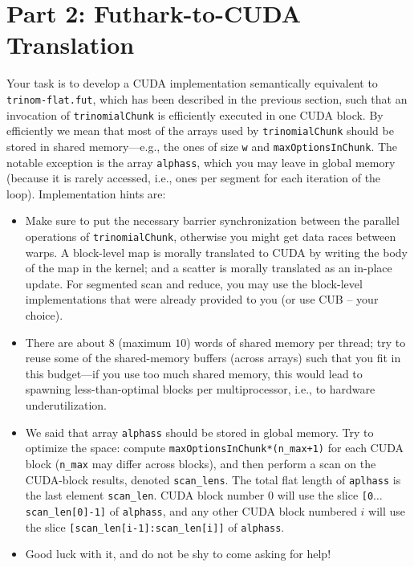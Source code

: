 \documentclass[a4paper,11pt]{article}
\begin{document}
\section{Part 2: Futhark-to-CUDA Translation}

Your task is to develop a CUDA implementation semantically equivalent to 
{\tt trinom-flat.fut}, which has been described in the previous
section, such that an invocation  of {\tt trinomialChunk} is efficiently 
executed in one CUDA block. By efficiently we mean that most of the arrays 
used by {\tt trinomialChunk} should be stored in shared memory---e.g.,
the ones of size {\tt w} and {\tt maxOptionsInChunk}. The notable exception
is the array {\tt alphass}, which you may leave in global memory (because
it is rarely accessed, i.e., ones per segment for each iteration of the loop).
%
Implementation hints are:
\begin{itemize}

    \item[(1)] Make sure to put the necessary barrier synchronization between
            the parallel operations of {\tt trinomialChunk}, otherwise you
            might get data races between warps. A block-level map is 
            morally translated to CUDA by writing the body of the map 
            in the kernel; and a scatter is morally translated as an
            in-place update. For segmented scan and reduce, you may
            use the block-level implementations that were already
            provided to you (or use CUB -- your choice).             

    \item[(2)] There are about $8$ (maximum $10$) words of shared memory per 
            thread; try to reuse some of the shared-memory buffers 
            (across arrays) such that you fit in this budget---if you
            use too much shared memory, this would lead to spawning
            less-than-optimal blocks per multiprocessor, i.e., 
            to hardware underutilization.

    \item[(3)]  We said that array {\tt alphass} should be stored in global
            memory. Try to optimize the space: compute 
            {\tt maxOptionsInChunk*(n\_max+1)} for each CUDA block
            ({\tt n\_max} may differ across blocks), and then perform 
            a scan on the CUDA-block results, denoted {\tt scan\_lens}. 
            The total flat length of {\tt aplhass} is the last element 
            {\tt scan\_len}. CUDA block number $0$ will use the slice
            {\tt [0$\ldots$scan\_len[0]-1]} of {\tt alphass}, 
            and any other CUDA block numbered $i$ will use the slice 
            {\tt[scan\_len[i-1]:scan\_len[i]]} of {\tt alphass}.

    \item[(4)]  Good luck with it, and do not be shy to come asking for help!
\end{itemize}
\end{document}
